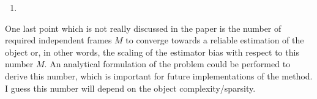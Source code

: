 \documentclass[12pt]{article}
\newenvironment{solved_reviewercomment}
    {\begin{tcolorbox}[width=\linewidth,colback=gray!5,colframe=solved_commentcolor!50,title=Reviewer Comment,left=5pt,right=5pt]}
    {\end{tcolorbox}}
\begin{document}
\begin{enumerate}[label=\arabic*., resume]
\item \leavevmode
\end{enumerate}
\vspace{-1em}
\begin{solved_reviewercomment}
    One last point which is not really discussed in the paper is the number of required independent frames \(M\) to converge towards a reliable estimation of the object or, in other words, the scaling of the estimator bias with respect to this number \(M\). An analytical formulation of the problem could be performed to derive this number, which is important for future implementations of the method. I guess this number will depend on the object complexity/sparsity.
\end{solved_reviewercomment}
    
\end{document}
